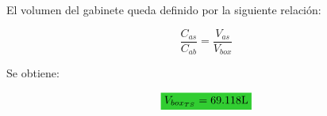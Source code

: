 \clearpage


El volumen del gabinete queda definido por la siguiente relación:

\begin{equation}
\frac{C_{as}}{C_{ab}} = \frac{V_{as}}{V_{box}}
\end{equation}

Se obtiene:

\begin{equation*}
\mathcolorbox{EQColor}{ V_{box_{TS}} = 69.118 \si[per-mode=symbol]{\liter} }
\end{equation*}




 
\begin{table}[H]  %

    \setlength\arrayrulewidth{1.5pt}
    \def\clinecolor{\hhline{|>{\arrayrulecolor{white}}-%
    >{\arrayrulecolor{white}}|-|-|-|}}
	\caption{\footnotesize{Comparación de los valores diseñados (\textit{Thiele-Small}) con los recomendados por el fabricante.}}
	\label{table:table_comparison_TS_recomendations}
\end{table}

